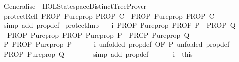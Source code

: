 %
\begin{isabellebody}%
%
%
\isadelimtheory
\isanewline
\isanewline
\isanewline
\isanewline
%
\endisadelimtheory
%
\isatagtheory
{}\isamarkupfalse%
\ Generalise\ \ {\isachardoublequoteopen}HOL{\isacharminus}Statespace{\isachardot}DistinctTreeProver{\isachardoublequoteclose}\isanewline
{}%
\endisatagtheory
{\isafoldtheory}%
%
\isadelimtheory
\isanewline
%
\endisadelimtheory
\isanewline
{}\isamarkupfalse%
\ protectRefl{\isacharcolon}\ {\isachardoublequoteopen}PROP\ Pure{\isachardot}prop\ {\isacharparenleft}PROP\ C{\isacharparenright}\ {\isasymLongrightarrow}\ PROP\ Pure{\isachardot}prop\ {\isacharparenleft}PROP\ C{\isacharparenright}{\isachardoublequoteclose}\isanewline
%
\isadelimproof
\ \ %
\endisadelimproof
%
\isatagproof
{}\isamarkupfalse%
\ {\isacharparenleft}simp\ add{\isacharcolon}\ prop{\isacharunderscore}def{\isacharparenright}%
\endisatagproof
{\isafoldproof}%
%
\isadelimproof
\isanewline
%
\endisadelimproof
\isanewline
{}\isamarkupfalse%
\ protectImp{\isacharcolon}\ \isanewline
\ \ i{\isacharcolon}\ {\isachardoublequoteopen}PROP\ Pure{\isachardot}prop\ {\isacharparenleft}PROP\ P\ {\isasymLongrightarrow}\ PROP\ Q{\isacharparenright}{\isachardoublequoteclose}\ \isanewline
\ \ {\isachardoublequoteopen}PROP\ Pure{\isachardot}prop\ {\isacharparenleft}PROP\ Pure{\isachardot}prop\ P\ {\isasymLongrightarrow}\ PROP\ Pure{\isachardot}prop\ Q{\isacharparenright}{\isachardoublequoteclose}\isanewline
%
\isadelimproof
%
\endisadelimproof
%
\isatagproof
{}\isamarkupfalse%
\ {\isacharminus}\isanewline
\ \ \isacommand{{\isacharbraceleft}}\isamarkupfalse%
\isanewline
\ \ \ \ \isamarkupfalse%
\ P{\isacharcolon}\ {\isachardoublequoteopen}PROP\ Pure{\isachardot}prop\ P{\isachardoublequoteclose}\isanewline
\ \ \ \ \isamarkupfalse%
\ i\ {\isacharbrackleft}unfolded\ prop{\isacharunderscore}def{\isacharcomma}\ OF\ P\ {\isacharbrackleft}unfolded\ prop{\isacharunderscore}def{\isacharbrackright}{\isacharbrackright}\ \isanewline
\ \ \ \ \isamarkupfalse%
\ {\isachardoublequoteopen}PROP\ Pure{\isachardot}prop\ Q{\isachardoublequoteclose}\isanewline
\ \ \ \ \ \ \isamarkupfalse%
\ {\isacharparenleft}simp\ add{\isacharcolon}\ prop{\isacharunderscore}def{\isacharparenright}\isanewline
\ \ \isacommand{{\isacharbraceright}}\isamarkupfalse%
\isanewline
\ \ \isamarkupfalse%
\ i{\isacharprime}\ {\isacharequal}\ this\isanewline

\end{isabellebody}
